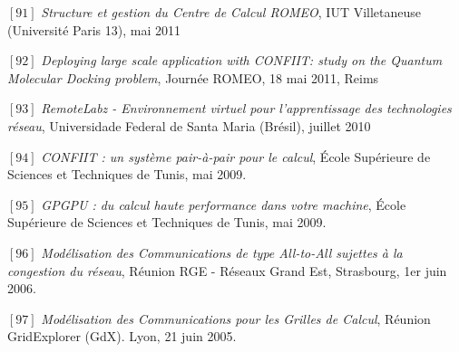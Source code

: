 \documentclass[final,twoside]{hdr} %
\begin{document}
\vspace{1em} \noindent $[91]$ {\em Structure et gestion du Centre de Calcul ROMEO}, IUT Villetaneuse (Université Paris 13), mai 2011

\vspace{1em} \noindent $[92]$ {\em Deploying large scale application with CONFIIT: study on the Quantum Molecular Docking problem}, {Journée ROMEO}, 18 mai 2011, Reims

\vspace{1em} \noindent $[93]$ {\em RemoteLabz - Environnement virtuel pour l’apprentissage des technologies réseau}, Universidade Federal de Santa Maria (Brésil), juillet 2010

\vspace{1em} \noindent $[94]$ {\em CONFIIT : un système pair-à-pair pour le calcul},  École Supérieure de Sciences et Techniques de Tunis, mai 2009.

\vspace{1em} \noindent $[95]$ {\em GPGPU : du calcul haute performance dans votre machine},  École Supérieure de Sciences et Techniques de Tunis, mai 2009.

\vspace{1em} \noindent $[96]$ {\em Modélisation des Communications de type All-to-All sujettes à la congestion du réseau}, {Réunion RGE - Réseaux Grand Est}, Strasbourg, 1er juin 2006.

\vspace{1em} \noindent $[97]$ {\em Modélisation des Communications pour les Grilles de Calcul}, {Réunion GridExplorer (GdX)}. Lyon, 21 juin 2005.




\end{document}
